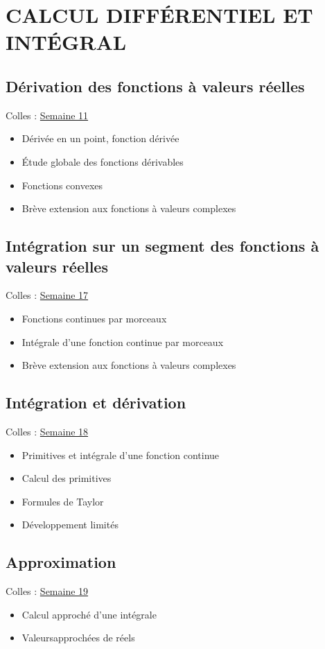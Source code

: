 \section{CALCUL DIFF\'ERENTIEL ET INT\'EGRAL}

\subsection{D\'erivation des fonctions \`a valeurs r\'eelles}
Colles : \href{S11.pdf}{Semaine 11}
\begin{itemize}
\item D\'eriv\'ee en un point, fonction d\'eriv\'ee
\item \'Etude globale des fonctions d\'erivables
\item Fonctions convexes
\item Br\`eve extension aux fonctions \`a valeurs complexes
\end{itemize}

\subsection{Int\'egration sur un segment des fonctions \`a valeurs
r\'eelles} Colles : \href{S17.pdf}{Semaine 17}
\begin{itemize}
\item Fonctions continues par morceaux
\item Int\'egrale d'une fonction continue par morceaux
\item Br{\`e}ve extension aux fonctions {\`a} valeurs
complexes
\end{itemize}

\subsection{Int\'egration et d\'erivation}
Colles : \href{S18.pdf}{Semaine 18}
\begin{itemize}
\item Primitives et int\'egrale d'une fonction continue
\item  Calcul des primitives
\item Formules de Taylor
\item D{\'e}veloppement limit{\'e}s
\end{itemize}

\subsection{Approximation}
Colles : \href{S19.pdf}{Semaine 19}
\begin{itemize}
\item Calcul approch\'e d'une int\'egrale
\item Valeursapproch\'ees de r\'eels
\end{itemize}

